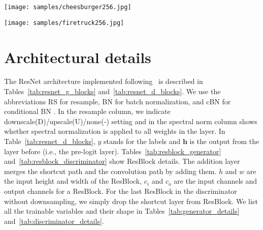 \documentclass{article}
\newcommand{\tranSSS}{\textsc{S\textsuperscript{3}GAN}}
\begin{document}
\begin{figure*}
\centering
\texttt{[image: samples/cheesburger256.jpg]}
\caption{Generated samples by \tranSSS{} (10\% labels, $256\times256$) for a single class. The model captures the diversity within the class.\label{fig:s2-20-256-3}}
\end{figure*}

\begin{figure*}
\centering
\texttt{[image: samples/firetruck256.jpg]}
\caption{Generated samples by \tranSSS{} (10\% labels, $256\times256$) for a single class. The model captures the diversity within the class. \label{fig:s2-20-256-4}}
\end{figure*}

\twocolumn

\section{Architectural details}\label{sec:arch_details}
The ResNet architecture implemented following~\citet{brock2018large} is described in Tables~\ref{tab:resnet_g_blocks} and~\ref{tab:resnet_d_blocks}.
We use the abbreviations RS for resample, BN for batch normalization, and cBN for conditional BN \cite{dumoulin2017learned, de2017modulating}. In the resample column, we indicate downscale(D)/upscale(U)/none(-) setting and in the spectral norm column shows whether spectral normalization is applied to all weights in the layer.
In Table~\ref{tab:resnet_d_blocks}, $y$ stands for the labels and $\bm{h}$ is the output from the layer before (i.e., the pre-logit layer).
Tables~\ref{tab:resblock_generator} and~\ref{tab:resblock_discriminator} show ResBlock details.
The addition layer merges the shortcut path and the convolution path by adding them.
$h$ and $w$ are the input height and width of the ResBlock,
$c_{i}$ and $c_{o}$ are the input channels and output channels for a ResBlock.
For the last ResBlock in the discriminator without downsampling,
we simply drop the shortcut layer from ResBlock. We list all the trainable variables and their shape in Tables~\ref{tab:generator_details} and~\ref{tab:discriminator_details}.
\end{document}
